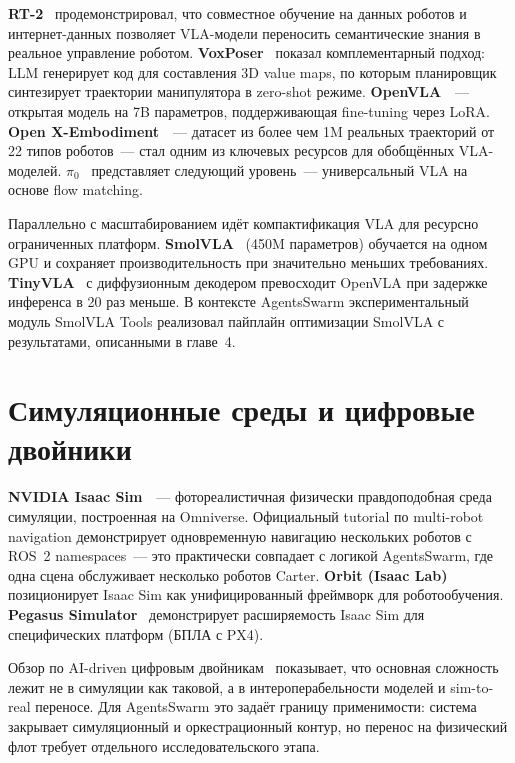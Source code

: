 \documentclass[14pt,a4paper]{extreport}
\begin{document}
\textbf{RT-2}~\cite{brohan2023rt2} продемонстрировал, что совместное обучение на данных роботов и интернет-данных позволяет VLA-модели переносить семантические знания в реальное управление роботом. \textbf{VoxPoser}~\cite{huang2023voxposer} показал комплементарный подход: LLM генерирует код для составления 3D value maps, по которым планировщик синтезирует траектории манипулятора в zero-shot режиме. \textbf{OpenVLA}~\cite{kim2024openvla}~--- открытая модель на 7B параметров, поддерживающая fine-tuning через LoRA. \textbf{Open X-Embodiment}~\cite{oxe2023}~--- датасет из более чем 1M реальных траекторий от 22 типов роботов~--- стал одним из ключевых ресурсов для обобщённых VLA-моделей. \textbf{$\pi_0$}~\cite{black2024pi0} представляет следующий уровень~--- универсальный VLA на основе flow matching.

Параллельно с масштабированием идёт компактификация VLA для ресурсно ограниченных платформ. \textbf{SmolVLA}~\cite{retzlaff2025smolvla} (450M параметров) обучается на одном GPU и сохраняет производительность при значительно меньших требованиях. \textbf{TinyVLA}~\cite{wen2025tinyvla} с диффузионным декодером превосходит OpenVLA при задержке инференса в 20 раз меньше. В контексте AgentsSwarm экспериментальный модуль SmolVLA Tools реализовал пайплайн оптимизации SmolVLA с результатами, описанными в главе~4.

\section{Симуляционные среды и цифровые двойники}

\textbf{NVIDIA Isaac Sim}~\cite{nvidia2024isaac}~--- фотореалистичная физически правдоподобная среда симуляции, построенная на Omniverse. Официальный tutorial по multi-robot navigation демонстрирует одновременную навигацию нескольких роботов с ROS~2 namespaces~--- это практически совпадает с логикой AgentsSwarm, где одна сцена обслуживает несколько роботов Carter. \textbf{Orbit (Isaac Lab)}~\cite{mittal2023orbit} позиционирует Isaac Sim как унифицированный фреймворк для роботообучения. \textbf{Pegasus Simulator}~\cite{jacinto2024pegasus} демонстрирует расширяемость Isaac Sim для специфических платформ (БПЛА с PX4).

Обзор по AI-driven цифровым двойникам~\cite{fuller2021digitaltwin} показывает, что основная сложность лежит не в симуляции как таковой, а в интероперабельности моделей и sim-to-real переносе. Для AgentsSwarm это задаёт границу применимости: система закрывает симуляционный и оркестрационный контур, но перенос на физический флот требует отдельного исследовательского этапа.
\end{document}
